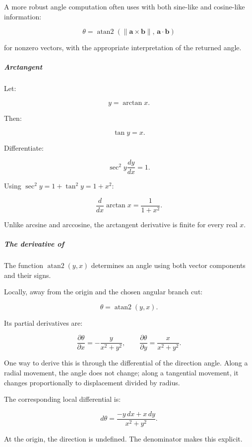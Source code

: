 A more robust angle computation often uses  with both sine-like and cosine-like information:

\[
\theta=\operatorname{atan2} \left(\|\mathbf a\times\mathbf b\|,\, \mathbf a\cdot\mathbf b\right)
\]

for nonzero vectors, with the appropriate interpretation of the returned angle.

\subparagraph{Arctangent}\label{01-foundations-i-ch020-arctangent}

\hypertarget{01-foundations-i-ch020-arctangent}{}

Let:

\[
y=\arctan x.
\]

Then:

\[
\tan y=x.
\]

Differentiate:

\[
\sec^2y\frac{dy}{dx}=1.
\]

Using \(\sec^2y=1+\tan^2y=1+x^2\):

\[
\boxed{\frac d{dx}\arctan x=\frac1{1+x^2}}.
\]

Unlike arcsine and arccosine, the arctangent derivative is finite for every real \(x\).

\subparagraph{\texorpdfstring{The derivative of }{The derivative of }}\label{01-foundations-i-ch020-the-derivative-of-atan2}

\hypertarget{01-foundations-i-ch020-the-derivative-of-atan2}{}

The function \(\operatorname{atan2}(y,x)\) determines an angle using both vector components and their signs.

Locally, away from the origin and the chosen angular branch cut:

\[
\theta=\operatorname{atan2}(y,x).
\]

Its partial derivatives are:

\[
\boxed{ \frac{\partial\theta}{\partial x} =-\frac{y}{x^2+y^2}, \qquad \frac{\partial\theta}{\partial y} =\frac{x}{x^2+y^2} }.
\]

One way to derive this is through the differential of the direction angle. Along a radial movement, the angle does not change; along a tangential movement, it changes proportionally to displacement divided by radius.

The corresponding local differential is:

\[
d\theta=\frac{-y\,dx+x\,dy}{x^2+y^2}.
\]

At the origin, the direction is undefined. The denominator makes this explicit.

